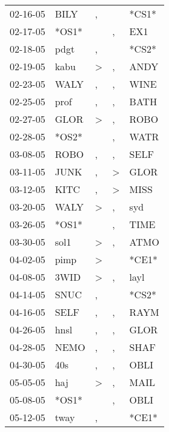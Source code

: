 \begin{supertabular}{lllll}
 02-16-05 &   BILY &                , &               &  *CS1* \\
 02-17-05 &  *OS1* &                  &             , &    EX1 \\
 02-18-05 &   pdgt &                , &               &  *CS2* \\
 02-19-05 &   kabu &     \textgreater &             , &   ANDY \\
 02-23-05 &   WALY &                , &             , &   WINE \\
 02-25-05 &   prof &                , &             , &   BATH \\
 02-27-05 &   GLOR &     \textgreater &             , &   ROBO \\
 02-28-05 &  *OS2* &                  &             , &   WATR \\
 03-08-05 &   ROBO &                , &             , &   SELF \\
 03-11-05 &   JUNK &                , &  \textgreater &   GLOR \\
 03-12-05 &   KITC &                , &  \textgreater &   MISS \\
 03-20-05 &   WALY &     \textgreater &             , &    syd \\
 03-26-05 &  *OS1* &                  &             , &   TIME \\
 03-30-05 &   sol1 &     \textgreater &             , &   ATMO \\
 04-02-05 &   pimp &     \textgreater &               &  *CE1* \\
 04-08-05 &   3WID &     \textgreater &             , &   layl \\
 04-14-05 &   SNUC &                , &               &  *CS2* \\
 04-16-05 &   SELF &                , &             , &   RAYM \\
 04-26-05 &   hnsl &                , &             , &   GLOR \\
 04-28-05 &   NEMO &                , &             , &   SHAF \\
 04-30-05 &    40s &                , &             , &   OBLI \\
 05-05-05 &    haj &     \textgreater &             , &   MAIL \\
 05-08-05 &  *OS1* &                  &             , &   OBLI \\
 05-12-05 &   tway &                , &               &  *CE1* \\

\end{supertabular}
